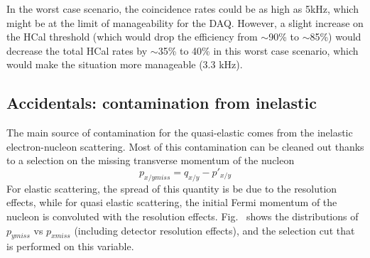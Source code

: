 In the worst case scenario, the coincidence rates could be as high as 5kHz, which might be at the limit of manageability for the DAQ.
However, a slight increase on the HCal threshold (which would drop the efficiency from $\sim$90\% to $\sim$85\%) would decrease the total HCal rates by $\sim$35\% to 40\% in this worst case scenario, which would make the situation more manageable (3.3 kHz).

\subsection{Accidentals: contamination from inelastic}

The main source of contamination for the quasi-elastic comes from the inelastic electron-nucleon scattering. Most of this contamination can be cleaned out thanks to a selection on the missing transverse momentum of the nucleon
%
\begin{equation}
  p_{x/y miss} = q_{x/y}-p'_{x/y}
\end{equation}
%
For elastic scattering, the spread of this quantity is be due to the resolution effects, while for quasi elastic scattering, the initial Fermi momentum of the nucleon is convoluted with the resolution effects.
Fig.~ shows the distributions of $p_{y miss}$ vs $p_{x miss}$ (including detector resolution effects), and the selection cut that is performed on this variable.




